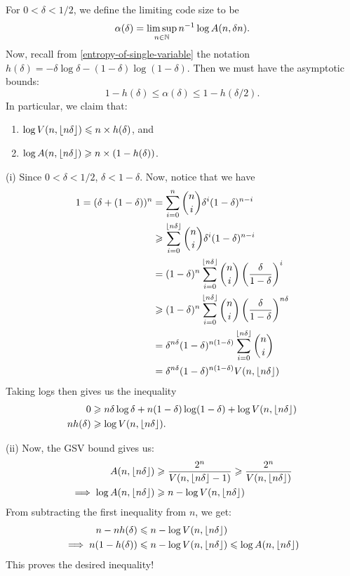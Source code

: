\documentclass{article}
\begin{document}
\begin{proposition}
	\label{asymptotic-gsv}
    For $0 < \delta < 1/2$, we define the limiting code size to be
    \[
	\alpha(\delta) = \limsup_{n \in \mathbb{N}} n^{-1} \log A(n, \delta n).
	\]
	Now, recall from \ref{entropy-of-single-variable}
	the notation $h(\delta) = -\delta \log \delta - (1-\delta)\log(1-\delta)$.
	Then we must have the asymptotic bounds:
    \[
	1 - h(\delta) \leq \alpha(\delta) \leq 1 - h(\delta/2).
	\]
	In particular, we claim that:
	
	\begin{enumerate}
    	\item[(i)] $\log V(n, \left\lfloor n\delta\right\rfloor) \leqslant n \times h(\delta)$, and
    	\item[(ii)] $\log A(n, \left\lfloor n\delta\right\rfloor) \geqslant n \times (1- h(\delta))$.
	\end{enumerate}
\end{proposition}

\begin{prf}
	(i) Since $0 < \delta < 1/2$, $\delta < 1-\delta$. Now, notice that we have
	\begin{align*}
    	1 = (\delta + (1 - \delta))^n &= \sum_{i=0}^n \binom n i \delta^i (1-\delta)^{n-i} \\
    	&\geqslant \sum_{i=0}^{\left\lfloor n \delta\right\rfloor} \binom n i \delta^i (1-\delta)^{n-i} \\
    	&= (1-\delta)^n \sum_{i=0}^{\left\lfloor n \delta\right\rfloor} \binom n i \left( \frac{\delta}{1-\delta} \right)^i \\
		&\geqslant (1-\delta)^n \sum_{i=0}^{\left\lfloor n \delta\right\rfloor} \binom n i \left( \frac{\delta}{1-\delta} \right)^{n \delta} \\
		&= \delta^{n\delta}(1-\delta)^{n(1-\delta)} \sum_{i=0}^{\left\lfloor n \delta\right\rfloor} \binom n i \\
		&= \delta^{n\delta}(1-\delta)^{n(1-\delta)} V(n, \left\lfloor n\delta\right\rfloor)
	\end{align*}
	Taking logs then gives us the inequality
	\begin{align*}
    	0 &\geqslant n\delta \log \delta + n(1-\delta) \log (1-\delta) + \log V(n, \left\lfloor n\delta\right\rfloor) \\
    	nh(\delta) &\geqslant \log V(n, \left\lfloor n\delta\right\rfloor).
	\end{align*}

    (ii) Now, the GSV bound gives us:
	\begin{align*}
    	A(n, \left\lfloor n \delta\right\rfloor) &\geqslant \frac{2^n}{V(n, \left\lfloor n \delta\right\rfloor - 1)} \geqslant \frac{2^n}{V(n, \left\lfloor n \delta\right\rfloor)} \\
    	\implies	 \log A(n, \left\lfloor n\delta\right\rfloor) &\geqslant n - \log V(n, \left\lfloor n \delta\right\rfloor)
	\end{align*}
	From subtracting the first inequality from $n$, we get:
	\begin{align*}
    	n - nh(\delta) &\leqslant n - \log V(n, \left\lfloor n\delta\right\rfloor) \\
    	\implies n(1- h(\delta)) &\leqslant n - \log V(n, \left\lfloor n\delta\right\rfloor) \leqslant \log A(n, \left\lfloor n\delta\right\rfloor)
	\end{align*}
	This proves the desired inequality!
\end{prf}
\end{document}

